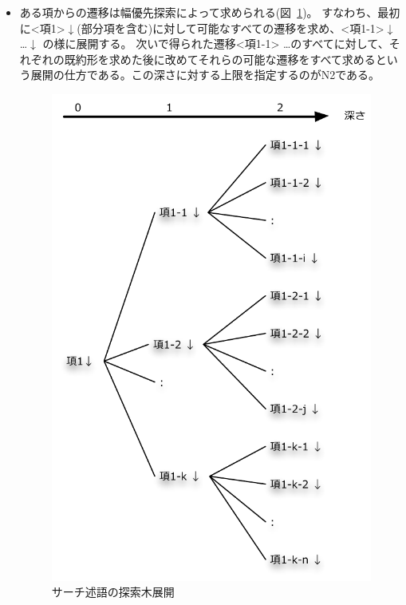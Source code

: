 \documentclass{article}
\begin{document}
\begin{itemize}
\begin{itemize}
\item ある項からの遷移は幅優先探索によって求められる(図~\ref{fig:dfs})。
すなわち、最初に<項1>$\downarrow$(部分項を含む)に対して可能なすべての遷移を求め、<項1-1>$\downarrow$ \ldots <項1-k>$\downarrow$ の様に展開する。
次いで得られた遷移<項1-1> \ldots <項1-n>のすべてに対して、それぞれの既約形を求めた後に改めてそれらの可能な遷移をすべて求めるという展開の仕方である。この深さに対する上限を指定するのがN2である。
\begin{figure}[htbp]
  \begin{center}
    \includegraphics[scale=0.6]{dfs.pdf}
    \caption{{サーチ述語の探索木展開}}
    \label{fig:dfs}
  \end{center}
\end{figure}


\end{itemize}
\end{itemize}
\end{document}
